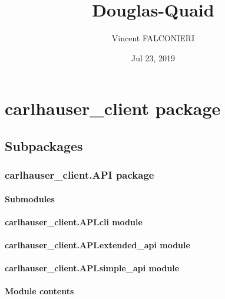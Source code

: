 \documentclass[letterpaper,10pt,english]{sphinxmanual}
\title{Douglas-Quaid}
\date{Jul 23, 2019}
\author{Vincent FALCONIERI}
\begin{document}
\pagestyle{empty}
\sphinxmaketitle
\pagestyle{plain}
\sphinxtableofcontents
\pagestyle{normal}
\label{\detokenize{index::doc}}



\chapter{carlhauser\_client package}
\label{\detokenize{carlhauser_client:carlhauser-client-package}}\label{\detokenize{carlhauser_client::doc}}

\section{Subpackages}
\label{\detokenize{carlhauser_client:subpackages}}

\subsection{carlhauser\_client.API package}
\label{\detokenize{carlhauser_client.API:carlhauser-client-api-package}}\label{\detokenize{carlhauser_client.API::doc}}

\subsubsection{Submodules}
\label{\detokenize{carlhauser_client.API:submodules}}

\subsubsection{carlhauser\_client.API.cli module}
\label{\detokenize{carlhauser_client.API:carlhauser-client-api-cli-module}}

\subsubsection{carlhauser\_client.API.extended\_api module}
\label{\detokenize{carlhauser_client.API:carlhauser-client-api-extended-api-module}}

\subsubsection{carlhauser\_client.API.simple\_api module}
\label{\detokenize{carlhauser_client.API:carlhauser-client-api-simple-api-module}}

\subsubsection{Module contents}
\label{\detokenize{carlhauser_client.API:module-carlhauser_client.API}}\label{\detokenize{carlhauser_client.API:module-contents}}
\end{document}
